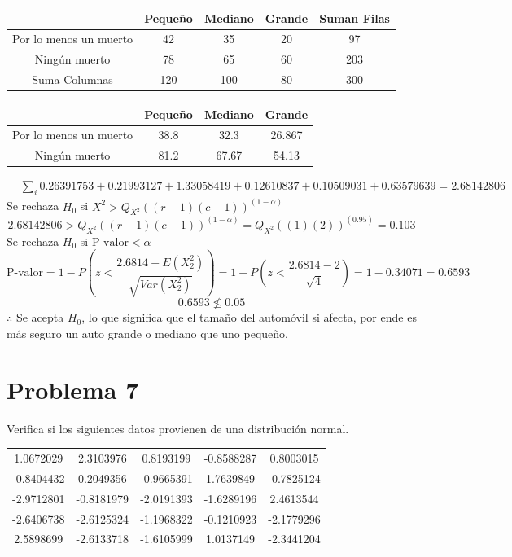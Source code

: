 \documentclass{article}
\begin{document}
\begin{center}
    \begin{tabular}{c| c c c c}
                               & Pequeño & Mediano & Grande & Suman Filas \\
        \hline
        Por lo menos un muerto & 42      & 35      & 20     & 97          \\
        Ningún muerto          & 78      & 65      & 60     & 203         \\
        Suma Columnas          & 120     & 100     & 80     & 300
    \end{tabular}
\end{center}
\begin{center}
    \begin{tabular}{c| c c c}
                               & Pequeño & Mediano & Grande \\
        \hline
        Por lo menos un muerto & 38.8    & 32.3    & 26.867 \\
        Ningún muerto          & 81.2    & 67.67   & 54.13  \\
    \end{tabular}
\end{center}
\begin{align*}
     & \sum\limits_{i} 0.26391753 + 0.21993127 + 1.33058419 + 0.12610837 + 0.10509031 + 0.63579639 = 2.68142806
\end{align*}
Se rechaza \( H_0 \) si \( X^2 > Q_{X^2}((r-1)(c-1))^{(1-\alpha)} \)
\[ 2.68142806 > Q_{X^2}((r-1)(c-1))^{(1-\alpha)} = Q_{X^2}((1)(2))^{(0.95)} = 0.103 \]
Se rechaza \( H_0 \) si \( \text{P-valor} < \alpha \)
\[ \text{P-valor} = 1 - P\left(z < \frac{2.6814 - E(X_2^2)}{\sqrt{Var(X_2^2)}}\right) = 1 - P\left(z < \frac{2.6814 - 2}{\sqrt{4}}\right) = 1 - 0.34071 = 0.6593 \]
\[ 0.6593 \not\leq 0.05 \]
$\therefore$ Se acepta $H_0$, lo que significa que el tamaño del automóvil si afecta, por ende es más seguro un auto grande o mediano que uno pequeño.

\section{Problema 7}

Verifica si los siguientes datos provienen de una distribución normal.
\begin{center}
    \begin{tabular}{c c c c c}
        1.0672029  & 2.3103976  & 0.8193199  & -0.8588287 & 0.8003015  \\
        -0.8404432 & 0.2049356  & -0.9665391 & 1.7639849  & -0.7825124 \\
        -2.9712801 & -0.8181979 & -2.0191393 & -1.6289196 & 2.4613544  \\
        -2.6406738 & -2.6125324 & -1.1968322 & -0.1210923 & -2.1779296 \\
        2.5898699  & -2.6133718 & -1.6105999 & 1.0137149  & -2.3441204 \\
    \end{tabular}
\end{center}
\end{document}
